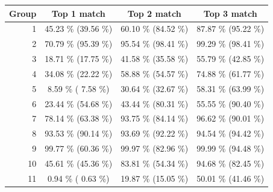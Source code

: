 \begin{table}[h]
\centering
\begin{tabular}{| r | c | c | c |}
\hline
Group & Top 1 match                     & Top 2 match                     & Top 3 match                     \\
\hline
1     & 45.23 \% {\color[HTML]{9B9B9B} (39.56 \%)} & 60.10 \% {\color[HTML]{9B9B9B} (84.52 \%)} & 87.87 \% {\color[HTML]{9B9B9B} (95.22 \%)} \\

2     & 70.79 \% {\color[HTML]{9B9B9B} (95.39 \%)} & 95.54 \% {\color[HTML]{9B9B9B} (98.41 \%)} & 99.29 \% {\color[HTML]{9B9B9B} (98.41 \%)} \\

3     & 18.71 \% {\color[HTML]{9B9B9B} (17.75 \%)} & 41.58 \% {\color[HTML]{9B9B9B} (35.58 \%)} & 55.79 \% {\color[HTML]{9B9B9B} (42.85 \%)} \\

4     & 34.08 \% {\color[HTML]{9B9B9B} (22.22 \%)} & 58.88 \% {\color[HTML]{9B9B9B} (54.57 \%)} & 74.88 \% {\color[HTML]{9B9B9B} (61.77 \%)} \\

5     & 8.59 \% {\color[HTML]{9B9B9B}( 7.58 \%)}  & 30.64 \% {\color[HTML]{9B9B9B} (32.67 \%)} & 58.31 \% {\color[HTML]{9B9B9B} (63.99 \%)} \\

6     & 23.44 \% {\color[HTML]{9B9B9B} (54.68 \%)} & 43.44 \% {\color[HTML]{9B9B9B} (80.31 \%)} & 55.55 \% {\color[HTML]{9B9B9B} (90.40 \%)} \\

7     & 78.14 \% {\color[HTML]{9B9B9B} (63.38 \%)} & 93.75 \% {\color[HTML]{9B9B9B} (84.14 \%)} & 96.62 \% {\color[HTML]{9B9B9B} (90.01 \%)} \\

8     & 93.53 \% {\color[HTML]{9B9B9B} (90.14 \%)} & 93.69 \% {\color[HTML]{9B9B9B} (92.22 \%)} & 94.54 \% {\color[HTML]{9B9B9B} (94.42 \%)} \\

9     & 99.77 \% {\color[HTML]{9B9B9B} (60.36 \%)} & 99.97 \% {\color[HTML]{9B9B9B} (82.96 \%)} & 99.99 \% {\color[HTML]{9B9B9B} (94.48 \%)} \\

10    & 45.61 \% {\color[HTML]{9B9B9B} (45.36 \%)} & 83.81 \% {\color[HTML]{9B9B9B} (54.34 \%)} & 94.68 \% {\color[HTML]{9B9B9B} (82.45 \%)} \\

11    & 0.94 \% {\color[HTML]{9B9B9B}( 0.63 \%)}  & 19.87 \% {\color[HTML]{9B9B9B} (15.05 \%)} & 50.01 \% {\color[HTML]{9B9B9B} (41.46 \%)} \\


\end{tabular}
\end{table}
